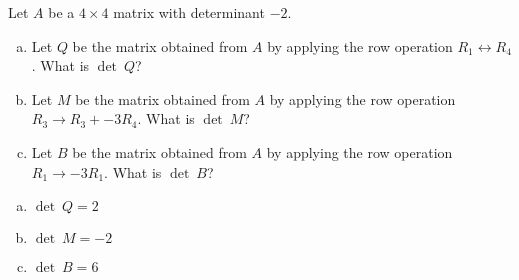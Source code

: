 
\begin{exerciseStatement}


Let \(A\) be a \(4 \times 4\) matrix with determinant \( -2 \).


\begin{enumerate}[(a)]
\item Let \(Q\) be the matrix obtained from \(A\) by applying the row operation \( R_1 \leftrightarrow R_4 \). What is \(\operatorname{det}\ Q\)?
\item Let \(M\) be the matrix obtained from \(A\) by applying the row operation \( R_3 \to R_3 + -3R_4 \). What is \(\operatorname{det}\ M\)?
\item Let \(B\) be the matrix obtained from \(A\) by applying the row operation \( R_1 \to -3R_1 \). What is \(\operatorname{det}\ B\)?
\end{enumerate}
    
\end{exerciseStatement}
    
\begin{exerciseAnswer} 

\begin{enumerate}[(a)]
\item \(\operatorname{det}\ Q= 2 \)
\item \(\operatorname{det}\ M= -2 \)
\item \(\operatorname{det}\ B= 6 \)
\end{enumerate}
    
\end{exerciseAnswer}
    
